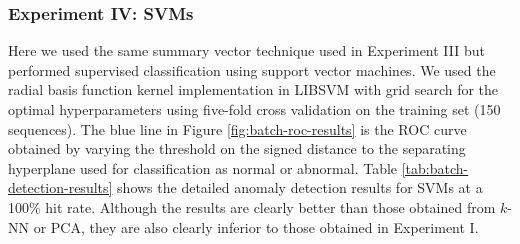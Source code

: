 
\subsubsection{Experiment IV: SVMs}

Here we used the same summary vector technique used in Experiment III
but performed supervised classification using support vector
machines. We used the radial basis function kernel implementation in
LIBSVM  with grid search for the optimal
hyperparameters using five-fold cross validation on the training set
(150 sequences). The blue line in Figure \ref{fig:batch-roc-results}
is the ROC curve obtained by varying the threshold on the signed
distance to the separating hyperplane used for classification as
normal or abnormal.  Table \ref{tab:batch-detection-results} shows the
detailed anomaly detection results for SVMs at a 100\% hit rate.
Although the results are clearly better than those obtained from
$k$-NN or PCA, they are also clearly inferior to those obtained in
Experiment I.


